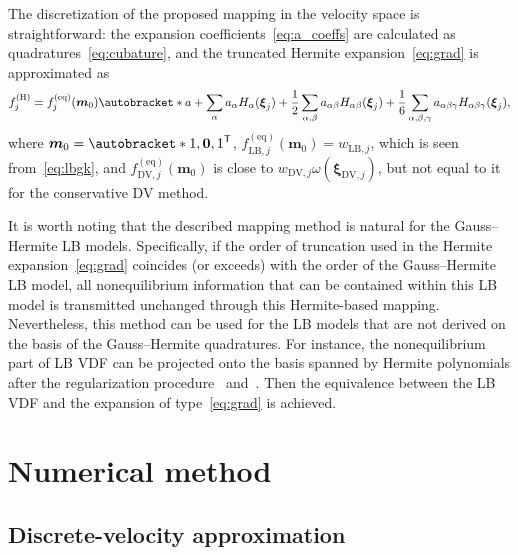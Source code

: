 \documentclass{article}
\newcommand{\transpose}[1]{#1^\mathsf{T}}
\DeclarePairedDelimiter\autobracket()       %
\newcommand{\br}[1]{\autobracket*{#1}}
\newcommand{\bxi}{{\boldsymbol{\xi}}}
\newcommand{\bm}{\boldsymbol{m}}
\newcommand{\equil}[1]{#1^\mathrm{(eq)}}
\newcommand{\hermite}[1]{#1^\mathrm{(H)}}
\newcommand{\LB}{\mathrm{LB}}
\newcommand{\DV}{\mathrm{DV}}
\newcommand{\Aa}{a_{\alpha}}
\newcommand{\Aab}{a_{\alpha\beta}}
\newcommand{\Aabg}{a_{\alpha\beta\gamma}}
\newcommand{\Ha}{H_{\alpha}}
\newcommand{\Hab}{H_{\alpha\beta}}
\newcommand{\Habg}{H_{\alpha\beta\gamma}}
\begin{document}
The discretization of the proposed mapping in the velocity space is straightforward:
the expansion coefficients~\eqref{eq:a_coeffs} are calculated as quadratures~\eqref{eq:cubature},
and the truncated Hermite expansion~\eqref{eq:grad} is approximated as
\begin{equation}\label{eq:discrete_grad}
    \hermite{f}_j = \equil{f}_j( \bm_0 ) \br{ a
        + \sum_{\alpha} \Aa \Ha(\bxi_j)
        + \frac12 \sum_{\alpha,\beta} \Aab \Hab(\bxi_j)
        + \frac16 \sum_{\alpha,\beta,\gamma} \Aabg \Habg(\bxi_j)
    },
\end{equation}
where \(\bm_0 = \transpose{\br{1, \boldsymbol{0}, 1}}\),
\(\equil{f}_{\LB,j}(\bm_0) = w_{\LB,j}\), which is seen from~\eqref{eq:lbgk},
and \(\equil{f}_{\DV,j}(\bm_0)\) is close to \(w_{\DV,j}\omega(\bxi_{\DV,j})\),
but not equal to it for the conservative DV method.

It is worth noting that the described mapping method is natural for the Gauss--Hermite LB models.
Specifically, if the order of truncation used in the Hermite expansion~\eqref{eq:grad}
coincides (or exceeds) with the order of the Gauss--Hermite LB model,
all nonequilibrium information that can be contained within this LB model
is transmitted unchanged through this Hermite-based mapping.
Nevertheless, this method can be used for the LB models
that are not derived on the basis of the Gauss--Hermite quadratures.
For instance, the nonequilibrium part of LB VDF can be projected onto the basis
spanned by Hermite polynomials after the regularization procedure~\cite{Latt2006, Chen2006}
and~\cite{Zhang2006, Mont2015, Mattila2017}.
Then the equivalence between the LB VDF and the expansion of type~\eqref{eq:grad} is achieved.

\section{Numerical method}\label{sec:numerics}

\subsection{Discrete-velocity approximation}\label{sec:dv}
\end{document}
